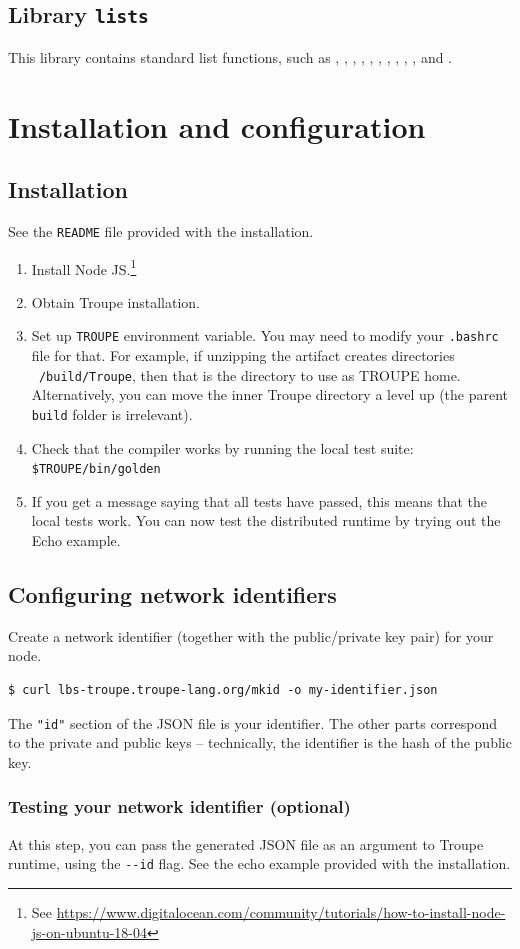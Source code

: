 \subsection{Library {\tt lists}}

This library contains standard list functions, such as , , ,
, , , , , , , 
and . 


\clearpage
\section{Installation and configuration}
\label{appendix:installationandconfig}
\subsection{Installation}
See the {\tt README} file provided with the installation.
\begin{enumerate}
    \item Install Node JS.\footnote{
    See \url{https://www.digitalocean.com/community/tutorials/how-to-install-node-js-on-ubuntu-18-04}}
    \item Obtain Troupe installation.
    \item Set up {\tt TROUPE} environment variable. You may need to modify your {\tt .bashrc} file for that. For example, if unzipping the artifact creates directories {\tt ~/build/Troupe}, then that is the directory to use as TROUPE home. Alternatively, you can move the inner Troupe directory a level up (the parent {\tt build} folder is irrelevant).
    \item Check that the compiler works by running the local test suite: {\tt \$TROUPE/bin/golden}
    \item If you get a message saying that all tests have passed, this means that the local tests work. You can now test the distributed runtime by trying out the Echo example.
\end{enumerate}
\fi


\subsection{Configuring network identifiers}
\label{sec:networkid}
Create a network identifier (together with the public/private key pair) for your node. 
\begin{verbatim}
$ curl lbs-troupe.troupe-lang.org/mkid -o my-identifier.json
\end{verbatim}

The {\tt "id"} section of the JSON file is your identifier. The other 
parts correspond to the private and public keys -- technically,
the identifier is the hash of the public key.


\subsubsection{Testing your network identifier (optional)}
At this step, you can pass the generated JSON file
as an argument to Troupe runtime, using the \verb+--id+ flag. See 
the echo example provided with the installation.
